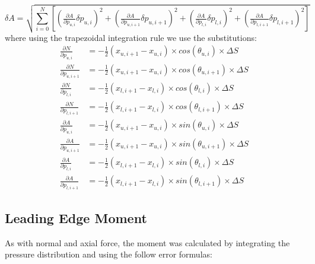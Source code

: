 \documentclass[11pt, letterpaper]{article}
\begin{document}
\begin{appendices}
\begin{equation}
    \delta A = \sqrt{\sum_{i=0}^N [(\tfrac{\partial A}{\partial p_{u,i}} \delta p_{u,i})^2 + (\tfrac{\partial A}{\partial p_{u,i+1}} \delta p_{u,i+1})^2 + (\tfrac{\partial A}{\partial p_{l,i}} \delta p_{l,i})^2 + (\tfrac{\partial A}{\partial p_{l,i+1}} \delta p_{l,i+1})^2]}
\end{equation}
where using the trapezoidal integration rule we use the substitutions:
\begin{align*}
    \tfrac{\partial N}{\partial p_{u,i}} &= -\tfrac{1}{2} (x_{u,i+1} - x_{u,i}) \times cos(\theta_{u,i}) \times \Delta S \\
    \tfrac{\partial N}{\partial p_{u,i+1}} &= -\tfrac{1}{2} (x_{u,i+1} - x_{u,i}) \times cos(\theta_{u,i+1}) \times \Delta S \\
    \tfrac{\partial N}{\partial p_{l,i}} &= -\tfrac{1}{2} (x_{l,i+1} - x_{l,i}) \times cos(\theta_{l,i}) \times \Delta S\\
    \tfrac{\partial N}{\partial p_{l,i+1}} &= -\tfrac{1}{2} (x_{l,i+1} - x_{l,i}) \times cos(\theta_{l,i+1}) \times \Delta S\\
    \tfrac{\partial A}{\partial p_{u,i}} &= -\tfrac{1}{2} (x_{u,i+1} - x_{u,i}) \times sin(\theta_{u,i}) \times \Delta S\\
    \tfrac{\partial A}{\partial p_{u,i+1}} &= -\tfrac{1}{2} (x_{u,i+1} - x_{u,i}) \times sin(\theta_{u,i+1}) \times \Delta S\\
    \tfrac{\partial A}{\partial p_{l,i}} &= -\tfrac{1}{2} (x_{l,i+1} - x_{l,i}) \times sin(\theta_{l,i}) \times \Delta S\\
    \tfrac{\partial A}{\partial p_{l,i+1}} &= -\tfrac{1}{2} (x_{l,i+1} - x_{l,i}) \times sin(\theta_{l,i+1}) \times \Delta S
\end{align*}

\subsection{Leading Edge Moment}

As with normal and axial force, the moment was calculated by integrating the pressure distribution and using the follow error formulas:


\end{appendices}
\end{document}
